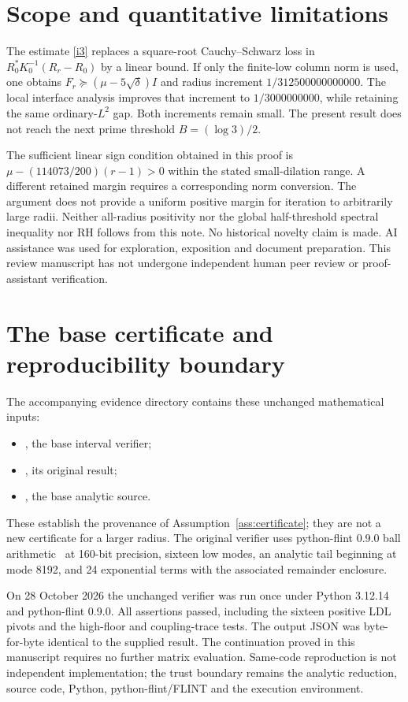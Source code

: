 \documentclass[11pt]{article}
\begin{document}
\section{Scope and quantitative limitations}
The estimate \eqref{i3} replaces a square-root Cauchy--Schwarz loss in
$R_0^*K_0^{-1}(R_r-R_0)$ by a linear bound. If only the finite-low
column norm is used, one obtains
$F_r\succeq(\mu-5\sqrt\delta)I$ and radius increment
$1/312500000000000$. The local interface analysis improves that increment
to $1/3000000000$, while retaining the same ordinary-$L^2$ gap.
Both increments remain small. The present result does not reach the
next prime threshold $B=(\log3)/2$.

The sufficient linear sign condition obtained in this proof is
$\mu-(114073/200)(r-1)>0$ within the stated small-dilation range.
A different retained margin requires a corresponding norm conversion.
The argument does not provide a uniform positive margin for iteration
to arbitrarily large radii. Neither all-radius positivity nor the global
half-threshold spectral inequality nor RH follows from this note.
No historical novelty claim is made. AI assistance was used for
exploration, exposition and document preparation. This review manuscript
has not undergone independent human peer review or proof-assistant
verification.

\clearpage
\appendix
\section{The base certificate and reproducibility boundary}
\label{app:reproduction}
The accompanying evidence directory contains these unchanged mathematical inputs:
\begin{itemize}
\item {}, the base interval verifier;
\item {}, its original result;
\item {}, the base analytic source.
\end{itemize}
These establish the provenance of
Assumption~\ref{ass:certificate}; they are not a new certificate for a
larger radius. The original verifier uses python-flint 0.9.0 ball arithmetic~\cite{flint} at 160-bit
precision, sixteen low modes, an analytic tail beginning at mode 8192,
and 24 exponential terms with the associated remainder enclosure.

On 28 October 2026 the unchanged verifier was run once under Python
3.12.14 and python-flint 0.9.0. All assertions passed, including the
sixteen positive LDL pivots and the high-floor and coupling-trace tests.
The output JSON was byte-for-byte identical to the supplied result.
The continuation proved in this manuscript requires no further matrix
evaluation. Same-code reproduction is not independent implementation;
the trust boundary remains the analytic reduction, source code,
Python, python-flint/FLINT and the execution environment.
\end{document}
